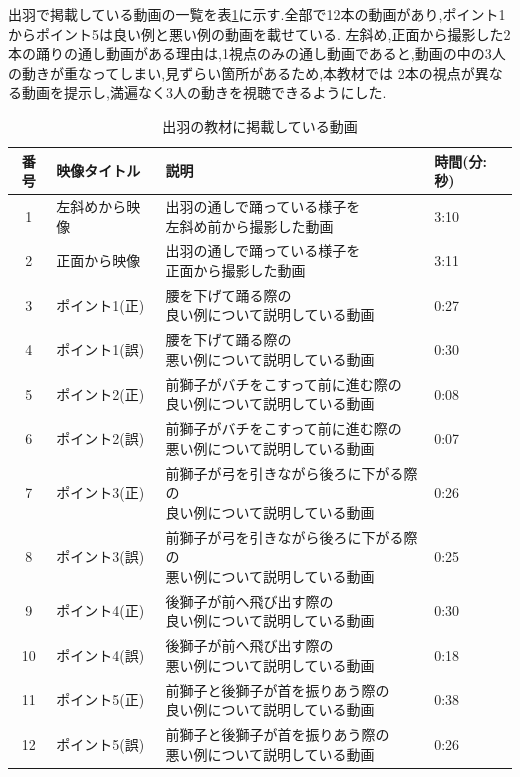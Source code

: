 \documentclass[12pt]{ltjsarticle}
\begin{document}
\clearpage

出羽で掲載している動画の一覧を表\ref{table:hdewa}に示す.全部で12本の動画があり,ポイント1からポイント5は良い例と悪い例の動画を載せている.
左斜め,正面から撮影した2本の踊りの通し動画がある理由は,1視点のみの通し動画であると,動画の中の3人の動きが重なってしまい,見ずらい箇所があるため,本教材では
2本の視点が異なる動画を提示し,満遍なく3人の動きを視聴できるようにした.

\begin{table}[h]
  \caption{出羽の教材に掲載している動画}
  \label{table:hdewa}
  \centering
  {\renewcommand\arraystretch{2.0}
   \begin{tabular}{clll}
    \hline
    番号 & 映像タイトル & 説明 & 時間(分:秒) \\
  
    \hline \hline
    1 &  左斜めから映像 &  \shortstack{出羽の通しで踊っている様子を\\左斜め前から撮影した動画} & 3:10 \\
    2 &  正面から映像 &  \shortstack{出羽の通しで踊っている様子を\\正面から撮影した動画} & 3:11 \\
    3 &  ポイント1(正) &  \shortstack{腰を下げて踊る際の\\良い例について説明している動画} & 0:27 \\
    4 &  ポイント1(誤) &  \shortstack{腰を下げて踊る際の\\悪い例について説明している動画} & 0:30 \\ 
    5 &  ポイント2(正) &  \shortstack{前獅子がバチをこすって前に進む際の\\良い例について説明している動画} & 0:08 \\ 
    6 &  ポイント2(誤) &  \shortstack{前獅子がバチをこすって前に進む際の\\悪い例について説明している動画} & 0:07 \\ 
    7 &  ポイント3(正) &  \shortstack{前獅子が弓を引きながら後ろに下がる際の\\良い例について説明している動画} & 0:26 \\ 
    8 &  ポイント3(誤) &  \shortstack{前獅子が弓を引きながら後ろに下がる際の\\悪い例について説明している動画} & 0:25 \\ 
    9 &  ポイント4(正) &  \shortstack{後獅子が前へ飛び出す際の\\良い例について説明している動画} & 0:30 \\ 
    10 &  ポイント4(誤) &  \shortstack{後獅子が前へ飛び出す際の\\悪い例について説明している動画} & 0:18 \\ 
    11 &  ポイント5(正) &  \shortstack{前獅子と後獅子が首を振りあう際の\\良い例について説明している動画} & 0:38 \\ 
    12 &  ポイント5(誤) &  \shortstack{前獅子と後獅子が首を振りあう際の\\悪い例について説明している動画} & 0:26 \\ 





\end{tabular}}
\end{table}
\end{document}
